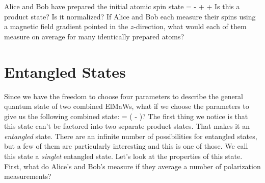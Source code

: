 \begin{exercise}
Alice and Bob have prepared the initial atomic spin state
\beq
\ket{\Psi} =  -  +  + 
\eeq
Is this a product state? Is it normalized? If Alice and Bob each measure their spins using a magnetic field gradient pointed in the $z$-direction, what would each of them measure on average for many identically prepared atoms?
\end{exercise}

\section{Entangled States}

Since we have the freedom to choose four parameters to describe the general quantum state of two combined ElMaWs, what if we choose the parameters to give us the following combined state:
\beq
{} = \left( - \right)?
\eeq
The first thing we notice is that this state can't be factored into two separate product states. That makes it an {\em entangled} state. There are an infinite number of possibilities for entangled states, but a few of them are particularly interesting and this is one of those. We call this state a {\em singlet} entangled state. Let's look at the properties of this state. First, what do Alice's and Bob's measure if they average a number of polarization measurements?
